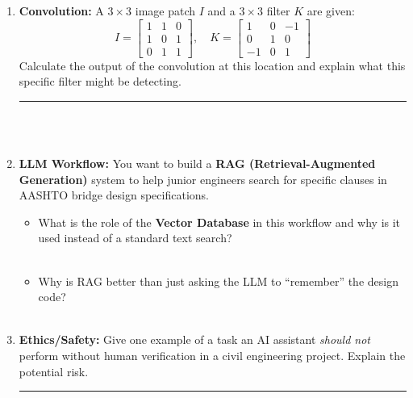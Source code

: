 \documentclass[12pt]{article}
\begin{document}
\begin{enumerate}[label=(\alph*)]
    \item \textbf{Convolution:} A $3 \times 3$ image patch $I$ and a $3 \times 3$ filter $K$ are given:
    \[ I = \begin{bmatrix} 1 & 1 & 0 \\ 1 & 0 & 1 \\ 0 & 1 & 1 \end{bmatrix}, \quad K = \begin{bmatrix} 1 & 0 & -1 \\ 0 & 1 & 0 \\ -1 & 0 & 1 \end{bmatrix} \]
    Calculate the output of the convolution at this location and explain what this specific filter might be detecting. \rule{1.5in}{0.15mm} \\
    \fullunderline \\
    \fullunderline

    \item \textbf{LLM Workflow:} You want to build a \textbf{RAG (Retrieval-Augmented Generation)} system to help junior engineers search for specific clauses in AASHTO bridge design specifications.
    \begin{itemize}
        \item What is the role of the \textbf{Vector Database} in this workflow and why is it used instead of a standard text search? \\
        \fullunderline \\
        \fullunderline
        \item Why is RAG better than just asking the LLM to ``remember'' the design code? \\
        \fullunderline \\
        \fullunderline
    \end{itemize}

    \item \textbf{Ethics/Safety:} Give one example of a task an AI assistant \textit{should not} perform without human verification in a civil engineering project. Explain the potential risk. \rule{3in}{0.15mm} \\
    \fullunderline \\
    \fullunderline
\end{enumerate}
\end{document}
